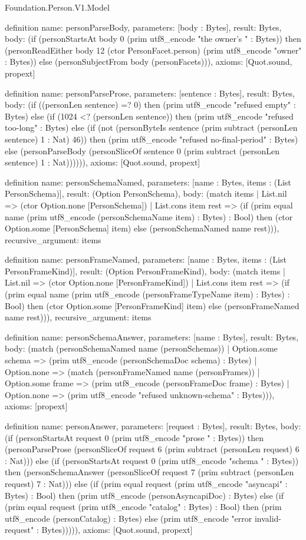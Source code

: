 \begin{lexlean}{Foundation.Person.V1.Model}
\begin{semanticmodule}
definition{
  name: personParseBody,
  parameters: [body : Bytes],
  result: Bytes,
  body: (if (personStartsAt body 0 (prim utf8_encode "the owner's " : Bytes)) then (personReadEither body 12 (ctor PersonFacet.person) (prim utf8_encode "owner" : Bytes)) else (personSubjectFrom body (personFacets))),
  axioms: [Quot.sound, propext]
}

definition{
  name: personParseProse,
  parameters: [sentence : Bytes],
  result: Bytes,
  body: (if ((personLen sentence) =? 0) then (prim utf8_encode "refused empty" : Bytes) else (if (1024 <? (personLen sentence)) then (prim utf8_encode "refused too-long" : Bytes) else (if (not (personByteIs sentence (prim subtract (personLen sentence) 1 : Nat) 46)) then (prim utf8_encode "refused no-final-period" : Bytes) else (personParseBody (personSliceOf sentence 0 (prim subtract (personLen sentence) 1 : Nat)))))),
  axioms: [Quot.sound, propext]
}

definition{
  name: personSchemaNamed,
  parameters: [name : Bytes, items : (List PersonSchema)],
  result: (Option PersonSchema),
  body: (match items
    | List.nil => (ctor Option.none [PersonSchema])
    | List.cons item rest => (if (prim equal name (prim utf8_encode (personSchemaName item) : Bytes) : Bool) then (ctor Option.some [PersonSchema] item) else (personSchemaNamed name rest))),
  recursive_argument: items
}

definition{
  name: personFrameNamed,
  parameters: [name : Bytes, items : (List PersonFrameKind)],
  result: (Option PersonFrameKind),
  body: (match items
    | List.nil => (ctor Option.none [PersonFrameKind])
    | List.cons item rest => (if (prim equal name (prim utf8_encode (personFrameTypeName item) : Bytes) : Bool) then (ctor Option.some [PersonFrameKind] item) else (personFrameNamed name rest))),
  recursive_argument: items
}

definition{
  name: personSchemaAnswer,
  parameters: [name : Bytes],
  result: Bytes,
  body: (match (personSchemaNamed name (personSchemas))
    | Option.some schema => (prim utf8_encode (personSchemaDoc schema) : Bytes)
    | Option.none => (match (personFrameNamed name (personFrames))
      | Option.some frame => (prim utf8_encode (personFrameDoc frame) : Bytes)
      | Option.none => (prim utf8_encode "refused unknown-schema" : Bytes))),
  axioms: [propext]
}

definition{
  name: personAnswer,
  parameters: [request : Bytes],
  result: Bytes,
  body: (if (personStartsAt request 0 (prim utf8_encode "prose " : Bytes)) then (personParseProse (personSliceOf request 6 (prim subtract (personLen request) 6 : Nat))) else (if (personStartsAt request 0 (prim utf8_encode "schema " : Bytes)) then (personSchemaAnswer (personSliceOf request 7 (prim subtract (personLen request) 7 : Nat))) else (if (prim equal request (prim utf8_encode "asyncapi" : Bytes) : Bool) then (prim utf8_encode (personAsyncapiDoc) : Bytes) else (if (prim equal request (prim utf8_encode "catalog" : Bytes) : Bool) then (prim utf8_encode (personCatalog) : Bytes) else (prim utf8_encode "error invalid-request" : Bytes))))),
  axioms: [Quot.sound, propext]
}


\end{semanticmodule}
\end{lexlean}
